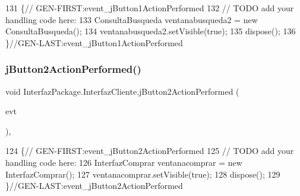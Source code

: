 \begin{DoxyCode}
131                                                                          \{\textcolor{comment}{//
      GEN-FIRST:event\_jButton1ActionPerformed}
132         \textcolor{comment}{// TODO add your handling code here:}
133         ConsultaBusqueda ventanabusqueda2 = \textcolor{keyword}{new} ConsultaBusqueda();
134         ventanabusqueda2.setVisible(\textcolor{keyword}{true});
135         dispose();
136     \}\textcolor{comment}{//GEN-LAST:event\_jButton1ActionPerformed}
\end{DoxyCode}
\mbox{\label{class_interfaz_package_1_1_interfaz_cliente_a07223b4b24e57be25514ed5d515a3fae}} 
\subsubsection{\texorpdfstring{j\+Button2\+Action\+Performed()}{jButton2ActionPerformed()}}
{\footnotesize\ttfamily void Interfaz\+Package.\+Interfaz\+Cliente.\+j\+Button2\+Action\+Performed (\begin{DoxyParamCaption}\item[{java.\+awt.\+event.\+Action\+Event}]{evt }\end{DoxyParamCaption})\hspace{0.3cm}{\ttfamily [inline]}, {\ttfamily [private]}}


\begin{DoxyCode}
124                                                                          \{\textcolor{comment}{//
      GEN-FIRST:event\_jButton2ActionPerformed}
125         \textcolor{comment}{// TODO add your handling code here:}
126         InterfazComprar ventanacomprar = \textcolor{keyword}{new} InterfazComprar();
127         ventanacomprar.setVisible(\textcolor{keyword}{true});
128         dispose();
129     \}\textcolor{comment}{//GEN-LAST:event\_jButton2ActionPerformed}
\end{DoxyCode}
\mbox{\label{class_interfaz_package_1_1_interfaz_cliente_a49bdd2ccad1a21cac6b70a069e440a69}} 

